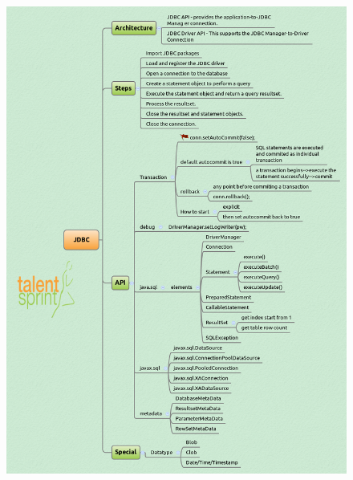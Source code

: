 \documentclass[11pt,a4paper]{article}
\begin{document}
\begin{figure}[H]
 \begin{center}
   \includegraphics[angle=90,height=20cm, width=13cm]{JDBC.png}
 \end{center}
 \end{figure}
\end{document}
